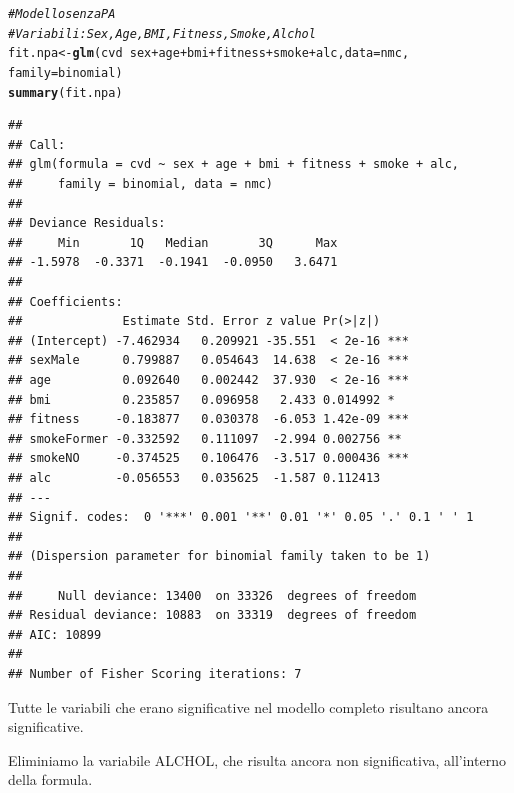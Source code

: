 \documentclass{article}\usepackage[]{graphicx}\usepackage[]{xcolor}
\makeatletter
\newcommand{\hlcom}[1]{\textcolor[rgb]{0.678,0.584,0.686}{\textit{#1}}}%
\newcommand{\hlopt}[1]{\textcolor[rgb]{0,0,0}{#1}}%
\newcommand{\hlstd}[1]{\textcolor[rgb]{0.345,0.345,0.345}{#1}}%
\newcommand{\hlkwb}[1]{\textcolor[rgb]{0.69,0.353,0.396}{#1}}%
\newcommand{\hlkwc}[1]{\textcolor[rgb]{0.333,0.667,0.333}{#1}}%
\newcommand{\hlkwd}[1]{\textcolor[rgb]{0.737,0.353,0.396}{\textbf{#1}}}%
\newenvironment{kframe}{%
 \def\at@end@of@kframe{}%
 \ifinner\ifhmode%
  \def\at@end@of@kframe{\end{minipage}}%
  \begin{minipage}{\columnwidth}%
 \fi\fi%
 \def\FrameCommand##1{\hskip\@totalleftmargin \hskip-\fboxsep
 \colorbox{shadecolor}{##1}\hskip-\fboxsep
     \hskip-\linewidth \hskip-\@totalleftmargin \hskip\columnwidth}%
 \MakeFramed {\advance\hsize-\width
   \@totalleftmargin\z@ \linewidth\hsize
   \@setminipage}}%
 {\par\unskip\endMakeFramed%
 \at@end@of@kframe}
\newenvironment{knitrout}{}{} %
\makeatother
\begin{document}
\begin{knitrout}
\color{fgcolor}\begin{kframe}
\begin{alltt}
\hlcom{#Modello senza PA}
\hlcom{#Variabili: Sex, Age, BMI, Fitness, Smoke, Alchol}
\hlstd{fit.npa} \hlkwb{<-} \hlkwd{glm}\hlstd{(cvd}\hlopt{~}\hlstd{sex}\hlopt{+}\hlstd{age}\hlopt{+}\hlstd{bmi}\hlopt{+}\hlstd{fitness}\hlopt{+}\hlstd{smoke}\hlopt{+}\hlstd{alc,} \hlkwc{data}\hlstd{=nmc,}
               \hlkwc{family}\hlstd{=binomial)}
\hlkwd{summary}\hlstd{(fit.npa)}
\end{alltt}
\begin{verbatim}
## 
## Call:
## glm(formula = cvd ~ sex + age + bmi + fitness + smoke + alc, 
##     family = binomial, data = nmc)
## 
## Deviance Residuals: 
##     Min       1Q   Median       3Q      Max  
## -1.5978  -0.3371  -0.1941  -0.0950   3.6471  
## 
## Coefficients:
##              Estimate Std. Error z value Pr(>|z|)    
## (Intercept) -7.462934   0.209921 -35.551  < 2e-16 ***
## sexMale      0.799887   0.054643  14.638  < 2e-16 ***
## age          0.092640   0.002442  37.930  < 2e-16 ***
## bmi          0.235857   0.096958   2.433 0.014992 *  
## fitness     -0.183877   0.030378  -6.053 1.42e-09 ***
## smokeFormer -0.332592   0.111097  -2.994 0.002756 ** 
## smokeNO     -0.374525   0.106476  -3.517 0.000436 ***
## alc         -0.056553   0.035625  -1.587 0.112413    
## ---
## Signif. codes:  0 '***' 0.001 '**' 0.01 '*' 0.05 '.' 0.1 ' ' 1
## 
## (Dispersion parameter for binomial family taken to be 1)
## 
##     Null deviance: 13400  on 33326  degrees of freedom
## Residual deviance: 10883  on 33319  degrees of freedom
## AIC: 10899
## 
## Number of Fisher Scoring iterations: 7
\end{verbatim}
\end{kframe}
\end{knitrout}
    
    Tutte le variabili che erano significative nel modello completo risultano 
    ancora significative. \par
    Eliminiamo la variabile ALCHOL, che risulta ancora non significativa,
    all'interno della formula.
    
\end{document}
